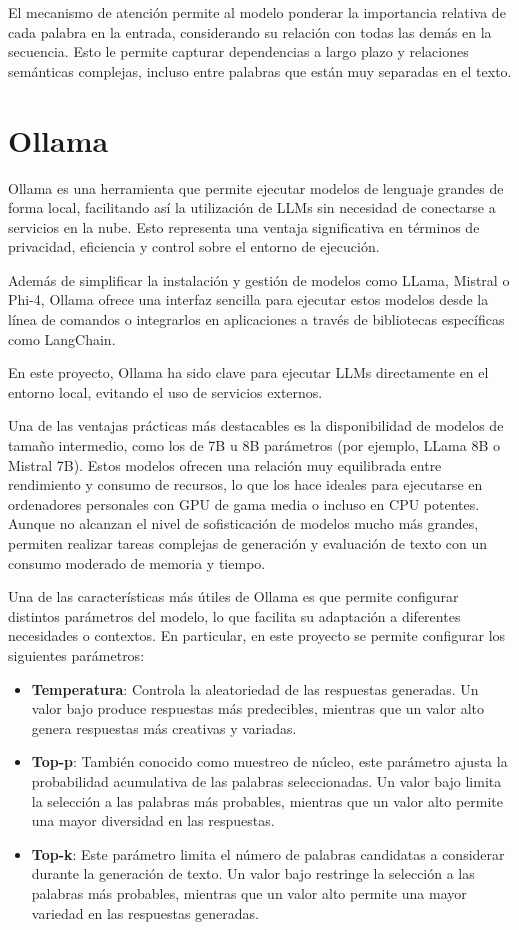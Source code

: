 El mecanismo de atención permite al modelo ponderar la importancia relativa de cada palabra 
en la entrada, considerando su relación con todas las demás en la secuencia. Esto le permite 
capturar dependencias a largo plazo y relaciones semánticas complejas, incluso entre palabras 
que están muy separadas en el texto.

\section{Ollama}

Ollama es una herramienta que permite ejecutar modelos de lenguaje grandes de forma local, 
facilitando así la utilización de LLMs sin necesidad de conectarse a servicios en la nube. 
Esto representa una ventaja significativa en términos de privacidad, eficiencia y control 
sobre el entorno de ejecución.

Además de simplificar la instalación y gestión de modelos como LLama, Mistral o Phi-4, 
Ollama ofrece una interfaz sencilla para ejecutar estos modelos desde la línea de comandos 
o integrarlos en aplicaciones a través de bibliotecas específicas como LangChain. 

En este proyecto, Ollama ha sido clave para ejecutar LLMs directamente en el entorno local,
evitando el uso de servicios externos.

Una de las ventajas prácticas más destacables es la disponibilidad de modelos de tamaño intermedio, 
como los de 7B u 8B parámetros (por ejemplo, LLama 8B o Mistral 7B). Estos modelos ofrecen 
una relación muy equilibrada entre rendimiento y consumo de recursos, lo que los hace ideales 
para ejecutarse en ordenadores personales con GPU de gama media o incluso en CPU potentes. 
Aunque no alcanzan el nivel de sofisticación de modelos mucho más grandes, permiten realizar 
tareas complejas de generación y evaluación de texto con un consumo moderado de memoria y tiempo.

Una de las características más útiles de Ollama es que permite configurar distintos parámetros 
del modelo, lo que facilita su adaptación a diferentes necesidades o contextos. 
En particular, en este proyecto se permite configurar los siguientes parámetros:

\begin{itemize}
	\item \textbf{Temperatura}: Controla la aleatoriedad de las respuestas generadas. Un valor bajo 
		produce respuestas más predecibles, mientras que un valor alto genera respuestas 
		más creativas y variadas.
	\item \textbf{Top-p}: También conocido como muestreo de núcleo, este parámetro ajusta la
		probabilidad acumulativa de las palabras seleccionadas. Un valor bajo limita la 
		selección a las palabras más probables, mientras que un valor alto permite una 
		mayor diversidad en las respuestas.
	\item \textbf{Top-k}: Este parámetro limita el número de palabras candidatas a considerar
		durante la generación de texto. Un valor bajo restringe la selección a las palabras 
		más probables, mientras que un valor alto permite una mayor variedad en las 
		respuestas generadas.
\end{itemize}

